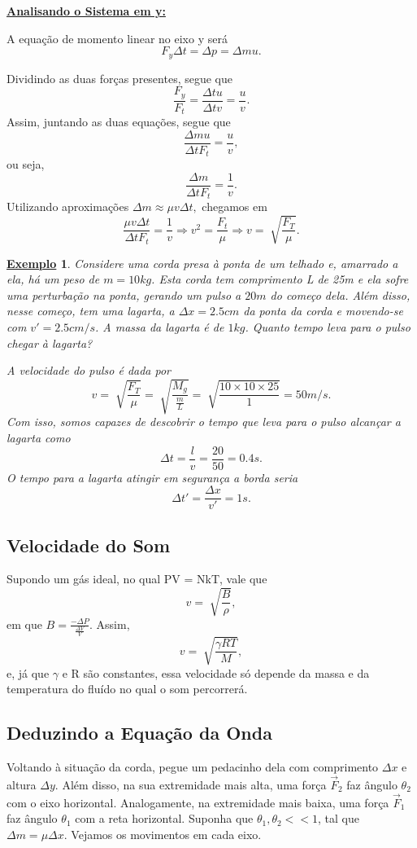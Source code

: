 \documentclass{article}
\newtheorem{example}{\underline{Exemplo}}
\begin{document}
\underline{\textbf{Analisando o Sistema em y:}}

  A equação de momento linear no eixo y será 
    \[
      F_{y}\Delta t = \Delta p = \Delta mu.
    \]

Dividindo as duas forças presentes, segue que 
  \[
    \frac{F_{y}}{F_{t}} = \frac{\Delta tu}{\Delta tv} = \frac{u}{v}.
  \]  
Assim, juntando as duas equações, segue que 
  \[
    \frac{\Delta m u}{\Delta t F_{t}} = \frac{u}{v},
  \]
ou seja, 
  \[
    \frac{\Delta m}{\Delta t F_{t}} = \frac{1}{v}.
  \]
Utilizando aproximações \(\Delta m\approx \mu v\Delta t,\) chegamos em 
  \[
    \frac{\mu v\Delta t}{\Delta t F_{t}} = \frac{1}{v} \Rightarrow v^{2}=\frac{F_{t}}{\mu} \Rightarrow v = \sqrt[]{\frac{F_{T}}{\mu}}.
  \]
\begin{example}
  Considere uma corda presa à ponta de um telhado e, amarrado a ela, há um peso de \(m=10kg\). Esta corda
tem comprimento L de 25m e ela sofre uma perturbação na ponta, gerando um pulso a \(20m \) do começo dela. Além disso,
nesse começo, tem uma lagarta, a \(\Delta x = 2.5cm\) da ponta da corda e movendo-se com \(v'=2.5cm/s\). A massa da
lagarta é de \(1kg\). Quanto tempo leva para o pulso chegar à lagarta?

  A velocidade do pulso é dada por 
    \[
      v = \sqrt[]{\frac{F_{T}}{\mu}}=\sqrt[]{\frac{M_{g}}{\frac{m}{L}}} = \sqrt[]{\frac{10\times 10\times 25}{1}}=50m/s.
    \]
Com isso, somos capazes de descobrir o tempo que leva para o pulso alcançar a lagarta como
    \[
      \Delta t = \frac{l}{v} = \frac{20}{50} = 0.4s.
    \]
O tempo para a lagarta atingir em segurança a borda seria 
    \[
      \Delta t' = \frac{\Delta x}{v'} = 1s.
    \]
\end{example}
\subsection{Velocidade do Som}
  Supondo um gás ideal, no qual PV = NkT, vale que 
    \[
      v = \sqrt[]{\frac{B}{\rho }},
    \]
em que \(B = \frac{-\Delta P}{\frac{\Delta V}{V}}.\) Assim, 
  \[
    v = \sqrt[]{\frac{\gamma RT}{M}},
  \]
e, já que \(\gamma \) e R são constantes, essa velocidade só depende da massa e da temperatura do fluído no qual
o som percorrerá.
\subsection{Deduzindo a Equação da Onda}
  Voltando à situação da corda, pegue um pedacinho dela com comprimento \(\Delta x\) e altura \(\Delta y\). Além disso,
na sua extremidade mais alta, uma força \(\vec{F}_{2}\) faz ângulo \(\theta_{2}\) com o eixo horizontal. Analogamente,
na extremidade mais baixa, uma força \(\vec{F}_{1}\) faz ângulo \(\theta_{1}\) com a reta horizontal. Suponha que
 \(\theta_{1}, \theta_{2} << 1\), tal que \(\Delta m = \mu\Delta x.\) Vejamos os movimentos em cada eixo.
\end{document}
